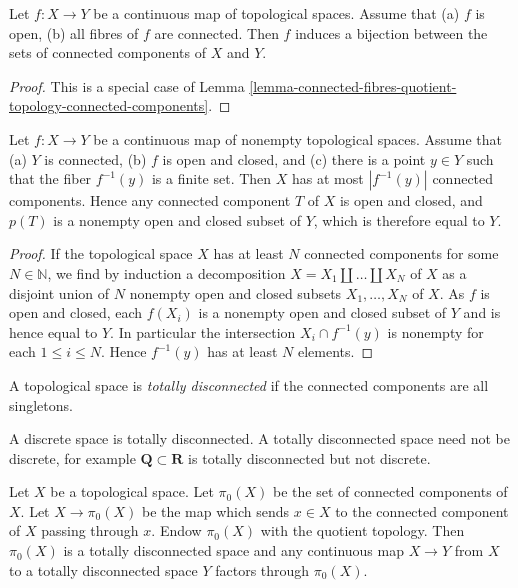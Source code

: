 \begin{lemma}
\label{lemma-connected-fibres-connected-components}
Let $f : X \to Y$ be a continuous map of topological spaces.
Assume that
(a) $f$ is open,
(b) all fibres of $f$ are connected.
Then $f$ induces a bijection between the sets of connected
components of $X$ and $Y$.
\end{lemma}

\begin{proof}
This is a special case of
Lemma \ref{lemma-connected-fibres-quotient-topology-connected-components}.
\end{proof}

\begin{lemma}
\label{lemma-finite-fibre-connected-components}
Let $f : X \to Y$ be a continuous map of nonempty topological spaces. Assume
that
(a) $Y$ is connected,
(b) $f$ is open and closed, and
(c) there is a point $y\in Y$ such that the fiber $f^{-1}(y)$ is a finite set.
Then $X$ has at most $|f^{-1}(y)|$ connected components. Hence any connected 
component $T$ of $X$ is open and closed, and $p(T)$ is a nonempty open and 
closed subset of $Y$, which is therefore equal to $Y$.
\end{lemma}

\begin{proof}
If the topological space $X$ has at least $N$ connected components for some
$N \in \mathbb{N}$, we find by induction a decomposition
$X = X_1 \amalg \dots \amalg X_N$ of $X$ as a disjoint union of $N$ nonempty
open and closed subsets $X_1, \dots , X_N$ of $X$. As $f$ is open and closed,
each $f(X_i)$ is a nonempty open and closed subset of $Y$ and is hence equal to
$Y$. In particular the intersection $X_i \cap f^{-1}(y)$ is nonempty for each
$1 \leq i \leq N$. Hence $f^{-1}(y)$ has at least $N$ elements.
\end{proof}

\begin{definition}
\label{definition-totally-disconnected}
A topological space is {\it totally disconnected} if the connected components
are all singletons.
\end{definition}

\noindent
A discrete space is totally disconnected.
A totally disconnected space need not be discrete, for example
$\mathbf{Q} \subset \mathbf{R}$ is totally disconnected but not discrete.

\begin{lemma}
\label{lemma-space-connected-components}
Let $X$ be a topological space. Let $\pi_0(X)$ be the set of connected
components of $X$. Let $X \to \pi_0(X)$ be the map which sends
$x \in X$ to the connected component of $X$ passing through $x$.
Endow $\pi_0(X)$ with the quotient topology. Then $\pi_0(X)$ is a
totally disconnected space and any continuous map $X \to Y$
from $X$ to a totally disconnected space $Y$ factors through $\pi_0(X)$.
\end{lemma}

